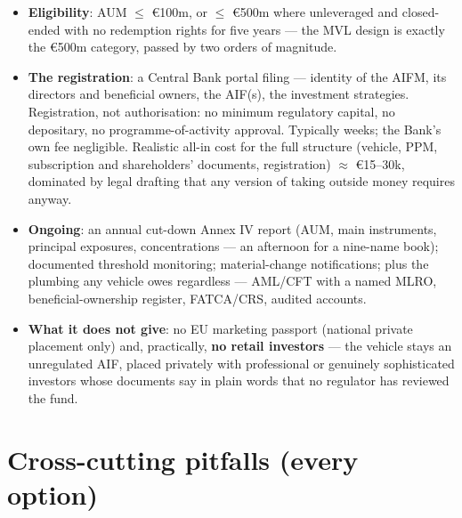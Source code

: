 \documentclass[11pt,a4paper]{article}
\begin{document}
\begin{itemize}[leftmargin=1.6em, itemsep=2pt]
\item \textbf{Eligibility}: AUM $\leq$ \euro 100m, or $\leq$ \euro 500m where
      unleveraged and closed-ended with no redemption rights for five years
      --- the MVL design is exactly the \euro 500m category, passed by two
      orders of magnitude.
\item \textbf{The registration}: a Central Bank portal filing --- identity of
      the AIFM, its directors and beneficial owners, the AIF(s), the
      investment strategies. Registration, not authorisation: no minimum
      regulatory capital, no depositary, no programme-of-activity approval.
      Typically weeks; the Bank's own fee negligible. Realistic all-in cost
      for the full structure (vehicle, PPM, subscription and shareholders'
      documents, registration) $\approx$ \euro 15--30k, dominated by legal
      drafting that any version of taking outside money requires anyway.
\item \textbf{Ongoing}: an annual cut-down Annex IV report (AUM, main
      instruments, principal exposures, concentrations --- an afternoon for a
      nine-name book); documented threshold monitoring; material-change
      notifications; plus the plumbing any vehicle owes regardless ---
      AML/CFT with a named MLRO, beneficial-ownership register, FATCA/CRS,
      audited accounts.
\item \textbf{What it does not give}: no EU marketing passport (national
      private placement only) and, practically, \textbf{no retail investors}
      --- the vehicle stays an unregulated AIF, placed privately with
      professional or genuinely sophisticated investors whose documents say
      in plain words that no regulator has reviewed the fund.
\end{itemize}

\section{Cross-cutting pitfalls (every option)}
\end{document}
